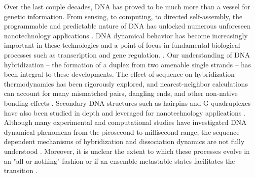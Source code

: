 \documentclass[journal=jpcbfk,manuscript=article]{achemso}
\begin{document}
Over the last couple decades, DNA has proved to be much more than a vessel for genetic information. From sensing, to computing, to directed self-assembly, the programmable and predictable nature of DNA has unlocked numerous unforeseen nanotechnology applications \citep{Seeman2017DNANanotechnology, Adleman1994MolecularProblems, Rothemund2006FoldingPatterns, Gu2010ALine}. DNA dynamical behavior has become increasingly important in these technologies and a point of focus in fundamental biological processes such as transcription and gene regulation.  \citep{Deluca2020DynamicDevices, Cordes2010SensingTransfer, Naimark2020DNADevelopment}. Our understanding of DNA hybridization -- the formation of a duplex from two amenable single strands -- has been integral to these developments. The effect of sequence on hybridization thermodynamics has been rigorously explored, and nearest-neighbor calculations can account for many mismatched pairs, dangling ends, and other non-native bonding effects \citep{SantaLucia1998AThermodynamics, Santalucia2004TM}. Secondary DNA structures such as hairpins and G-quadruplexes have also been studied in depth and leveraged for nanotechnology applications \citep{Tsukanov2013DetailedOrigami, Mosayebi2014TheFormation, Mergny2019DNANanotechnology}. Although many experimental and computational studies have investigated DNA dynamical phenomena from the picosecond to millisecond range, the sequence-dependent mechanisms of hybridization and dissociation dynamics are not fully understood \citep{Yin2011KineticsHybridization, Xiao2019, Hinckley2014Coarse-grainedEffects, Sanstead2016, Porschke1971CooperativeTransition, Porschke1973ThermodynamicsPairs, Chen2007InfluenceHybridization, Craig1971ElaxationOligon}. Moreover, it is unclear the extent to which these processes evolve in an "all-or-nothing" fashion or if an ensemble metastable states facilitates the transition \citep{Araque2016LatticeCooperativity, Sikora2013ModelingIntermediates}.
\end{document}
